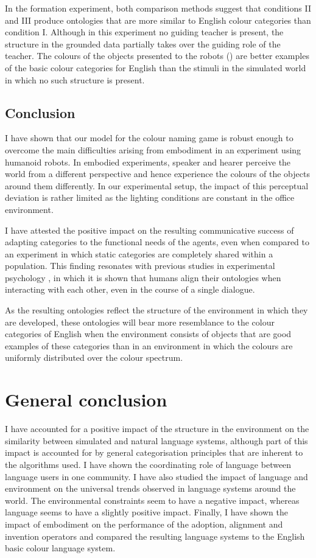 In the formation experiment, both comparison methods suggest that
conditions II and III produce ontologies that are more similar to
English colour categories than condition I. Although in this
experiment no guiding teacher is present, the structure in the
grounded data partially takes over the guiding role of the
teacher. The colours of the objects presented to the robots () are better examples of the basic colour
categories for English than the stimuli in the simulated world in
which no such structure is present.

\subsection{Conclusion}

I have shown that our model for the colour naming game is robust
enough to overcome the main difficulties arising from embodiment in an
experiment using humanoid robots. In embodied experiments, speaker and
hearer perceive the world from a different perspective and hence
experience the colours of the objects around them differently. In our
experimental setup, the impact of this perceptual deviation is rather
limited as the lighting conditions are constant in the office
environment.

I have attested the positive impact on the resulting communicative
success of adapting categories to the functional needs of the agents,
even when compared to an experiment in which static categories are
completely shared within a population. This finding resonates with
previous studies in experimental psychology
\citep{garrod94conversation}, in which it is shown that humans align
their ontologies when interacting with each other, even in the course
of a single dialogue.

As the resulting ontologies reflect the structure of the environment
in which they are developed, these ontologies will bear more
resemblance to the colour categories of English when the environment
consists of objects that are good examples of these categories than in
an environment in which the colours are uniformly distributed over the
colour spectrum.

\section{General conclusion}

I have accounted for a positive impact of the structure in the
environment on the similarity between simulated and natural language
systems, although part of this impact is accounted for by general
categorisation principles that are inherent to the algorithms used. I
have shown the coordinating role of language between language users in
one community. I have also studied the impact of language and
environment on the universal trends observed in language systems
around the world. The environmental constraints seem to have a
negative impact, whereas language seems to have a slightly positive
impact. Finally, I have shown the impact of embodiment on the
performance of the adoption, alignment and invention operators and
compared the resulting language systems to the English basic colour
language system.

\newpage
\thispagestyle{empty}